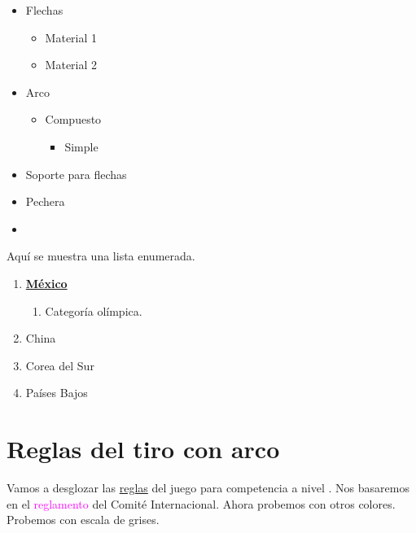 \documentclass[12pt, legalpaper, twocolumn]{article}
\begin{document}
\begin{itemize}  %
    \item[\ding{36}] Flechas
        \begin{itemize} %
            \item[\ding{116}] Material 1
            \item Material 2
        \end{itemize}
    \item[\ding{61}] \textcolor{color5}{Arco}
        \begin{itemize} %
            \item Compuesto
                \begin{itemize} %
                    \item Simple
                \end{itemize}
        \end{itemize}
    \item [\ding{61}]Soporte para flechas
    \item[\ding{61}] Pechera
    \item 
\end{itemize}

Aquí se muestra una lista enumerada.

\begin{enumerate}
    \item \textcolor{color4}{\uline{\textbf{México}}}
        \begin{enumerate}
            \item Categoría olímpica.
        \end{enumerate}
    \item China
    \item Corea del Sur
    \item \textcolor{bittersweet}{Países Bajos}
\end{enumerate}

\section{Reglas del tiro con arco}

\begin{flushright}

Vamos a desglozar las \uline{reglas} del juego para competencia a nivel . Nos basaremos en el \textcolor{magenta}{reglamento} del Comité    \textcolor{miguel}{Internacional}. Ahora probemos con otros \textcolor{color2}{colores}. Probemos con escala de \textcolor{color3}{grises.} 
\end{flushright}
\end{document}
